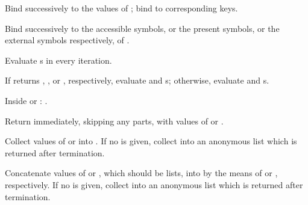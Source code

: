 \begin{LIST}{1cm}
\begin{LIST}{.5cm}
\begin{LIST}{.5cm}
\begin{LIST}{.5cm}
        {
          Bind  successively to the values of
          ; bind  to corresponding keys.
        }

        {
          Bind  successively to the accessible symbols, or
          the present symbols, or the external symbols respectively,
          of .
        }

      \end{LIST}
    \end{LIST}

    {
      Evaluate s in every iteration.
    }

    {
      If  returns \T, \T, or \NIL, respectively, evaluate
       and s; otherwise, evaluate
       and s.
    }

    \begin{LIST}{.5cm}
      {
        Inside  or :
        .
      }
    \end{LIST}

    {
      Return immediately, skipping any  parts, with
      values of  or .
    }

    {
      Collect values of  or  into . If no
       is given, collect into an anonymous list which is
      returned after termination.
    }

    {
      Concatenate values of  or , which should be
      lists, into  by the means of  or ,
      respectively.  If no  is given, collect into an
      anonymous list which is returned after termination.
    }


\end{LIST}
\end{LIST}
